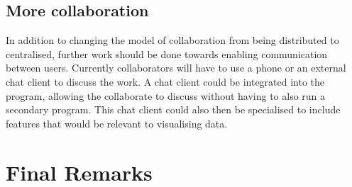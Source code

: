 \subsection{More collaboration}
In addition to changing the model of collaboration from being distributed to centralised, further work should be done towards enabling communication between users.  Currently collaborators will have to use a phone or an external chat client to discuss the work.  A chat client could be integrated into the program, allowing the collaborate to discuss without having to also run a secondary program.  This chat client could also then be specialised to include features that would be relevant to visualising data.

\section{Final Remarks}

